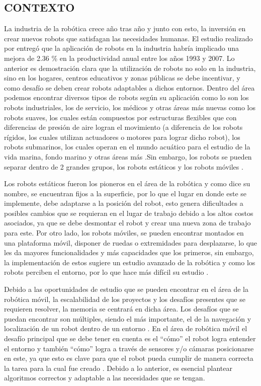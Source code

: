 
\subsection{CONTEXTO}
La industria de la robótica crece año tras año y junto con esto, la inversión en crear nuevos robots que satisfagan las necesidades humanas. El estudio realizado por \cite{graetz_online_nodate} entregó que la aplicación de robots en la industria habría implicado una mejora de 2.36 \% en la productividad anual entre los años 1993 y 2007. Lo anterior es demostración clara que la utilización de robots no solo en la industria, sino en los hogares, centros educativos y zonas públicas se debe incentivar, y como desafío se deben crear robots adaptables a dichos entornos. Dentro del área podemos encontrar diversos tipos de robots según su aplicación como lo son los robots industriales, los de servicio, los médicos y otras áreas más nuevas como los robots suaves, los cuales están compuestos por estructuras flexibles que con diferencias de presión de aire logran el movimiento (a diferencia de los robots rígidos, los cuales utilizan actuadores o motores para lograr dicho robot), los robots submarinos, los cuales operan en el mundo acuático para el estudio de la vida marina, fondo marino y otras áreas más .Sin embargo, los robots se pueden separar dentro de 2 grandes grupos, los robots estáticos y los robots móviles \cite{thrun_probabilistic_2005}.

Los robots estáticos fueron los pioneros en el área de la robótica y como dice su nombre, se encuentran fijos a la superficie, por lo que el lugar en donde este se implemente, debe adaptarse a la posición del robot, esto genera dificultades a posibles cambios que se requieran en el lugar de trabajo debido a los altos costos asociados, ya que se debe desmontar el robot y crear una nueva zona de trabajo para este. Por otro lado, los robots móviles, se pueden encontrar montados en una plataforma móvil, disponer de ruedas o extremidades para desplazarse, lo que les da mayores funcionalidades y más capacidades que los primeros, sin embargo, la implementación de estos sugiere un estudio avanzado de la robótica y como los robots perciben el entorno, por lo que hace más difícil su estudio \cite{fahimi_autonomous_2009}.

Debido a las oportunidades de estudio que se pueden encontrar en el área de la robótica móvil, la escalabilidad de los proyectos y los desafíos presentes que se requieren resolver, la memoria se centrará en dicha área. Los desafíos que se puedan encontrar son múltiples, siendo el más importante, el de la navegación y localización de un robot dentro de un entorno \cite{noauthor_global_nodate}. En el área de robótica móvil el desafío principal que se debe tener en cuenta es el ``cómo'' el robot logra entender el entorno y también ``cómo'' logra a través de sensores y/o cámaras posicionarse en este, ya que esto es clave para que el robot pueda cumplir de manera correcta la tarea para la cual fue creado \cite{quigley_programming_nodate}. Debido a lo anterior, es esencial plantear algoritmos correctos y adaptable a las necesidades que se tengan.

